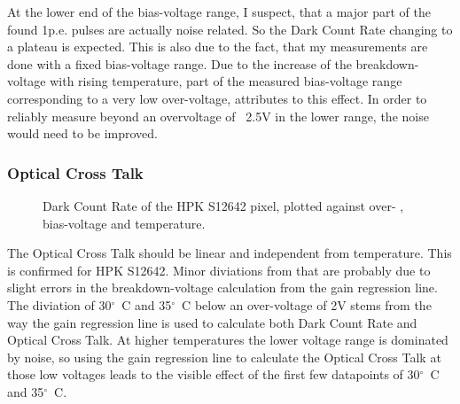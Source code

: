 \documentclass[12pt,article,type=msc,colorback,accentcolor=tud9c]{tudthesis}
\begin{document}
At the lower end of the bias-voltage range, I suspect, that a major part of the found 1p.e. pulses are actually noise related. So the Dark Count Rate changing to a plateau is expected. This is also due to the fact, that my measurements are done with a fixed bias-voltage range. Due to the increase of the breakdown-voltage with rising temperature, part of the measured bias-voltage range corresponding to a very low over-voltage, attributes to this effect. In order to reliably measure beyond an overvoltage of ~2.5V in the lower range, the noise would need to be improved.  





\subsubsection{Optical Cross Talk}
\begin{figure}[h]
\begin{centering}
\caption{Dark Count Rate of the HPK S12642 pixel, plotted against over- , bias-voltage and temperature.}
\label{fig:S12642_OCT}
\end{centering}
\end{figure}
The Optical Cross Talk should be linear and independent from temperature. This is confirmed for HPK S12642. Minor diviations from that are probably due to slight errors in the breakdown-voltage calculation from the gain regression line. The diviation of 30${^\circ}$~C and 35${^\circ}$~C below an over-voltage of 2V stems from the way the gain regression line is used to calculate both Dark Count Rate and Optical Cross Talk. At higher temperatures the lower voltage range is dominated by noise, so using the gain regression line to calculate the Optical Cross Talk at those low voltages leads to the visible effect of the first few datapoints of 30${^\circ}$~C and 35${^\circ}$~C. 
\end{document}
